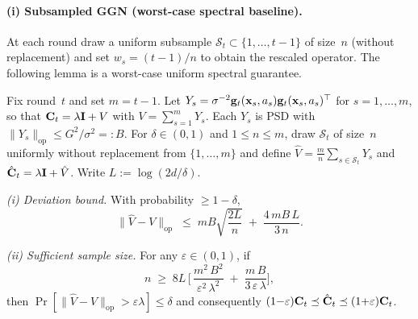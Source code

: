 \paragraph{(i) Subsampled GGN (worst-case spectral baseline).}
At each round draw a uniform subsample $\mathcal{S}_t\subset\{1,\dots,t{-}1\}$
of size~$n$ (without replacement) and set $w_s=(t{-}1)/n$ to obtain the
rescaled operator.
The following lemma is a worst-case uniform spectral guarantee.

\begin{lemma}\label{lem:subsample}
Fix round~$t$ and set $m=t{-}1$.
Let $Y_s = \sigma^{-2}\mathbf{g}_t(\mathbf{x}_s,a_s)\mathbf{g}_t(\mathbf{x}_s,a_s)^\top$ for
$s=1,\dots,m$, so that $\mathbf{C}_t = \lambda\mathbf{I} + V$ with $V=\sum_{s=1}^m Y_s$.
Each $Y_s$ is PSD with $\|Y_s\|_{\mathrm{op}}\le G^2/\sigma^2 =: B$.
For $\delta\in(0,1)$ and $1\le n\le m$, draw $\mathcal{S}_t$ of size~$n$
uniformly without replacement from
$\{1,\dots,m\}$ and define $\hat V = \tfrac{m}{n}\sum_{s\in\mathcal{S}_t}Y_s$
and $\hat{\mathbf{C}}_t = \lambda\mathbf{I} + \hat V$.
Write $L:=\log(2d/\delta)$.

\emph{(i) Deviation bound.}
With probability $\ge 1-\delta$,
\begin{equation}\label{eq:subsample-dev}
  \|\hat V - V\|_{\mathrm{op}}
  \;\le\;
  mB\sqrt{\frac{2L}{n}}
  \;+\;
  \frac{4\,mB\,L}{3\,n}.
\end{equation}

\emph{(ii) Sufficient sample size.}
For any $\varepsilon\in(0,1)$, if
\begin{equation}\label{eq:subsample-n}
  n \;\ge\; 8L\,\biggl[\,
    \frac{m^2\,B^2}{\varepsilon^2\,\lambda^2}
    \;+\;
    \frac{m\,B}{3\,\varepsilon\,\lambda}
  \biggr],
\end{equation}
then $\Pr[\|\hat V - V\|_{\mathrm{op}} > \varepsilon\lambda] \le \delta$
and consequently
$(1{-}\varepsilon)\mathbf{C}_t\preceq\hat{\mathbf{C}}_t\preceq(1{+}\varepsilon)\mathbf{C}_t$.
\end{lemma}
